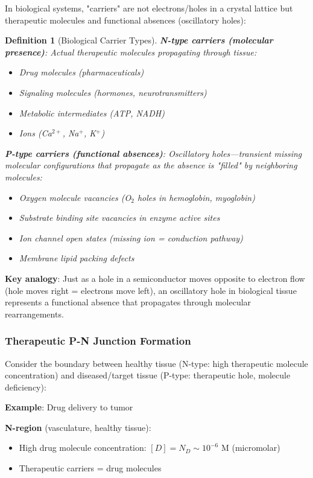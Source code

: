 \documentclass[11pt,a4paper]{article}
\newtheorem{definition}{Definition}[section]
\begin{document}
In biological systems, "carriers" are not electrons/holes in a crystal lattice but therapeutic molecules and functional absences (oscillatory holes):

\begin{definition}[Biological Carrier Types]
\label{def:bio_carriers}
\textbf{N-type carriers (molecular presence)}: Actual therapeutic molecules propagating through tissue:
\begin{itemize}
\item Drug molecules (pharmaceuticals)
\item Signaling molecules (hormones, neurotransmitters)
\item Metabolic intermediates (ATP, NADH)
\item Ions (Ca$^{2+}$, Na$^+$, K$^+$)
\end{itemize}

\textbf{P-type carriers (functional absences)}: Oscillatory holes—transient missing molecular configurations that propagate as the absence is "filled" by neighboring molecules:
\begin{itemize}
\item Oxygen molecule vacancies (O$_2$ holes in hemoglobin, myoglobin)
\item Substrate binding site vacancies in enzyme active sites
\item Ion channel open states (missing ion = conduction pathway)
\item Membrane lipid packing defects
\end{itemize}
\end{definition}

\textbf{Key analogy}: Just as a hole in a semiconductor moves opposite to electron flow (hole moves right = electrons move left), an oscillatory hole in biological tissue represents a functional absence that propagates through molecular rearrangements.

\subsubsection{Therapeutic P-N Junction Formation}

Consider the boundary between healthy tissue (N-type: high therapeutic molecule concentration) and diseased/target tissue (P-type: therapeutic hole, molecule deficiency):

\textbf{Example}: Drug delivery to tumor

\textbf{N-region} (vasculature, healthy tissue):
\begin{itemize}
\item High drug molecule concentration: $[D] = N_D \sim 10^{-6}$ M (micromolar)
\item Therapeutic carriers = drug molecules
\end{itemize}
\end{document}
